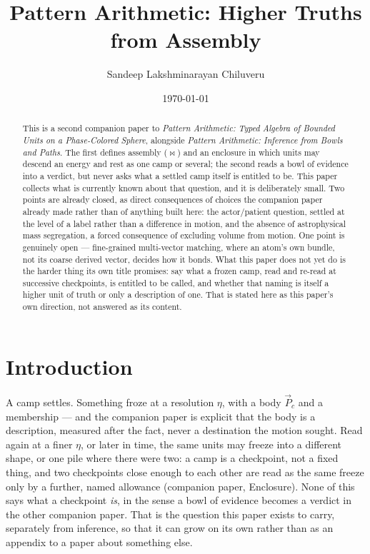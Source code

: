 \documentclass[12pt, a4paper]{article}
\title{Pattern Arithmetic: Higher Truths from Assembly}
\author{Sandeep Lakshminarayan Chiluveru}
\date{\today}
\begin{document}
\maketitle

\begin{abstract}
This is a second companion paper to \emph{Pattern Arithmetic: Typed
Algebra of Bounded Units on a Phase-Colored Sphere}, alongside
\emph{Pattern Arithmetic: Inference from Bowls and Paths}. The first
defines assembly ($\bowtie$) and an enclosure in which units may
descend an energy and rest as one camp or several; the second reads
a bowl of evidence into a verdict, but never asks what a settled
camp itself is entitled to be. This paper collects what is currently
known about that question, and it is deliberately small. Two points
are already closed, as direct consequences of choices the companion
paper already made rather than of anything built here: the
actor/patient question, settled at the level of a label rather than
a difference in motion, and the absence of astrophysical mass
segregation, a forced consequence of excluding volume from motion.
One point is genuinely open --- fine-grained multi-vector matching,
where an atom's own bundle, not its coarse derived vector, decides
how it bonds. What this paper does not yet do is the harder thing
its own title promises: say what a frozen camp, read and re-read at
successive checkpoints, is entitled to be called, and whether that
naming is itself a higher unit of truth or only a description of
one. That is stated here as this paper's own direction, not
answered as its content.
\end{abstract}

\section{Introduction}
\label{sec:intro}

A camp settles. Something froze at a resolution $\eta$, with a body
$\vec P_{c}$ and a membership --- and the companion paper is
explicit that the body is a description, measured after the fact,
never a destination the motion sought. Read again at a finer $\eta$,
or later in time, the same units may freeze into a different shape,
or one pile where there were two: a camp is a checkpoint, not a
fixed thing, and two checkpoints close enough to each other are
read as the same freeze only by a further, named allowance
(companion paper, Enclosure). None of this says what a checkpoint
\emph{is}, in the sense a bowl of evidence becomes a verdict in the
other companion paper. That is the question this paper exists to
carry, separately from inference, so that it can grow on its own
rather than as an appendix to a paper about something else.
\end{document}

